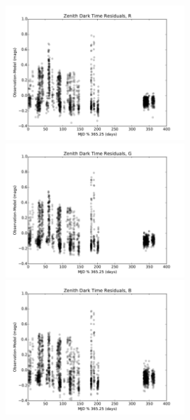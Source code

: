 \documentclass[]{spie}
\begin{document}
\begin{figure}
  \includegraphics[height=5cm]{plots/residTOY_R.pdf}\includegraphics[height=5cm]{plots/residTOY_G.pdf}\includegraphics[height=5cm]{plots/residTOY_B.pdf} \\

\end{figure}
\end{document}
